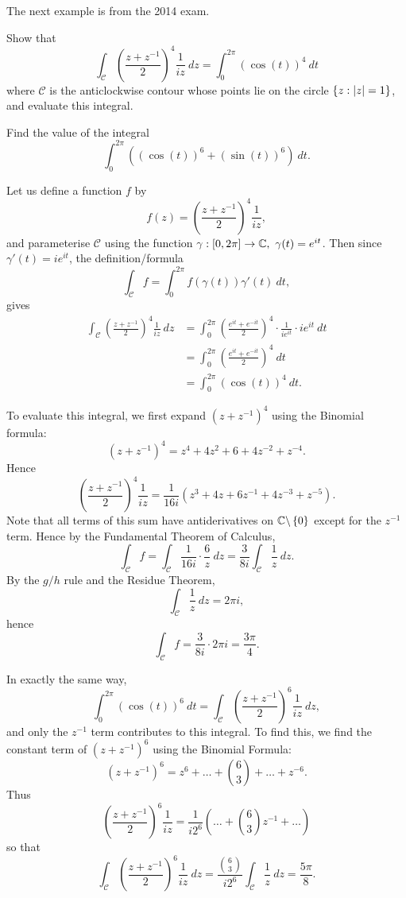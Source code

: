 The next example is from the 2014 exam.
\begin{example}
Show that
\[
\int_{\mathcal{C}} \left( \frac{z+z^{-1}}{2} \right)^4 \frac{1}{iz}\ dz = \int_0^{2\pi} (\cos(t))^4\ dt
\]
where $\mathcal{C}$ is the anticlockwise contour whose points lie on the circle $\left\{z: \left| z \right|= 1 \right\}$, and evaluate this integral.

Find the value of the integral
\[
\int_0^{2\pi} \left( (\cos(t))^6+(\sin (t))^6 \right)\ dt.
\]
\end{example}
\begin{solution}
Let us define a function $f$ by
\[
f(z) =\left( \frac{z+z^{-1}}{2} \right)^4 \frac{1}{iz},
\]
and parameterise $\mathcal{C}$ using the function $\gamma:[0,2\pi ] \to \C,\ \gamma(t)=e^{it}$.  Then since $\gamma'(t)=ie^{it}$, the definition/formula
\[
\int_{\mathcal{C}} f = \int_0^{2\pi} f (\gamma (t)) \gamma' (t)\ dt,
\]
gives
\begin{align*}
\int_{\mathcal{C}} \left( \frac{z+z^{-1}}{2} \right)^4 \frac{1}{iz}\ dz & = \int_0^{2\pi} \left( \frac{e^{it}+e^{-it}}{2} \right)^4 \cdot \frac{1}{ie^{it}} \cdot ie^{it}\ dt \\
& = \int_0^{2\pi} \left( \frac{e^{it}+e^{-it}}{2} \right)^4 \ dt \\
& = \int_0^{2\pi} (\cos(t))^4\ dt.
\end{align*}

To evaluate this integral, we first expand $(z+z^{-1})^4$ using the Binomial formula:
\[
(z+z^{-1})^4 = z^4+4z^2+6+4z^{-2}+z^{-4}.
\]
Hence
\[
\left( \frac{z+z^{-1}}{2} \right)^4 \frac{1}{iz} = \frac{1}{16i} \left(z^3+4z+6z^{-1}+4z^{-3}+z^{-5} \right).
\]
Note that all terms of this sum have antiderivatives on $\mathbb{C} \backslash \left\{0\right\}$ except for the $z^{-1}$ term.  Hence by the Fundamental Theorem of Calculus,
\[
\int_{\mathcal{C}} f = \int_{\mathcal{C}} \frac{1}{16i} \cdot \frac{6}{z} \ dz = \frac{3}{8i} \int_{\mathcal{C}} \frac{1}{z}\ dz.
\]
By the $g/h$ rule and the Residue Theorem,
\[ \int_{\mathcal{C}} \frac{1}{z}\ dz = 2\pi i,
\]
hence
\[
\int_{\mathcal{C}} f = \frac{3}{8i} \cdot 2\pi i = \frac{3\pi}{4}.
\]

In exactly the same way,
\[
\int_0^{2\pi} \left( \cos (t) \right)^6\ dt = \int_{\mathcal{C}} \left( \frac{z+z^{-1}}{2} \right)^6 \frac{1}{iz}\ dz,
\]
and only the $z^{-1}$ term contributes to this integral.  To find this, we find the constant term of $(z+z^{-1})^6$ using the Binomial Formula:
\[
(z+z^{-1})^6 = z^6 + \ldots + \binom{6}{3} + \ldots + z^{-6}.
\]
Thus
\[
\left( \frac{z+z^{-1}}{2} \right)^6 \frac{1}{iz} = \frac{1}{i2^6} \left( \ldots + \binom{6}{3} z^{-1} + \ldots \right)
\]
so that 
\[
\int_{\mathcal{C}} \left( \frac{z+z^{-1}}{2} \right)^6 \frac{1}{iz}\ dz =  \frac{\binom{6}{3}}{i2^6} \int_{\mathcal{C}} \frac{1}{z}\ dz = \frac{5\pi}{8}.
\]


\end{solution}
